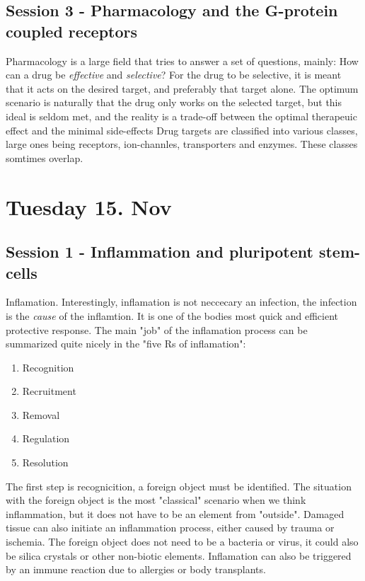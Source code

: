 \documentclass[12p]{article}
\begin{document}
\subsection*{Session 3 - Pharmacology and the G-protein coupled receptors}

Pharmacology is a large field that tries to answer a set of questions, mainly: How can a drug be \emph{effective} and \emph{selective}?
For the drug to be selective, it is meant that it acts on the desired target, and preferably that target alone.
The optimum scenario is naturally that the drug only works on the selected target, but this ideal is seldom met, and the reality is a trade-off between the optimal therapeuic effect and the minimal side-effects
Drug targets are classified into various classes, large ones being receptors, ion-channles, transporters and enzymes. 
These classes somtimes overlap.


\section*{Tuesday 15. Nov}

\subsection*{Session 1 - Inflammation and pluripotent stem-cells}

Inflamation. 
Interestingly, inflamation is not neccecary an infection, the infection is the \emph{cause} of the inflamtion.
It is one of the bodies most quick and efficient protective response.
The main "job" of the inflamation process can be summarized quite nicely in the "five Rs of inflamation":

\begin{enumerate}
    \item
	Recognition 
    \item
	Recruitment 
    \item
	Removal
    \item
	Regulation
    \item
	Resolution
\end{enumerate}

The first step is recognicition, a foreign object must be identified.
The situation with the foreign object is the most "classical" scenario when we think inflammation, but it does not have to be an element from "outside".
Damaged tissue can also initiate an inflammation process, either caused by trauma or ischemia.
The foreign object does not need to be a bacteria or virus, it could also be silica crystals or other non-biotic elements.
Inflamation can also be triggered by an immune reaction due to allergies or body transplants.
\end{document}
